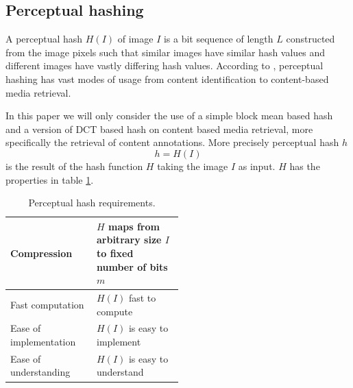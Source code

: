 \documentclass[english,12pt,a4paper,pdftex,elec,utf8, table]{aaltothesis}
\begin{document}
\subsection{Perceptual hashing} \label{perceptualhash}
A perceptual hash $H(I)$ of image $I$ is a bit sequence of length $L$ constructed from the image pixels such that similar images have similar hash values and different images have vastly differing hash values. According to \cite{Zauner2010}, perceptual hashing has vast modes of usage from content identification to content-based media retrieval.

In this paper we will only consider the use of a simple block mean based hash and a version of DCT based hash on content based media retrieval, more specifically the retrieval of content annotations. More precisely perceptual hash $h$
\begin{equation}\label{hashfunction}
h = H(I)
\end{equation}
is the result of the hash function $H$ taking the image $I$ as input. $H$ has the properties in table \ref{hashcriteria}.

\def\arraystretch{1.5}
\begin{table}[htb]
\caption{Perceptual hash requirements. \cite{Zauner2010}}
\label{hashcriteria}
\begin{center}
\begin{tabular}{lp{0.5\linewidth}}
  \hline \hline
  Compression & $H$ maps from arbitrary size $I$ to fixed number of bits $m$\\
  \hline
  Fast computation & $H(I)$ fast to compute \\
  \hline
  Ease of implementation & $H(I)$ is easy to implement\\
  \hline
  Ease of understanding & $H(I)$ is easy to understand\\
  \hline
\end{tabular}
\end{center}\end{table}
\end{document}
